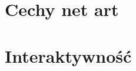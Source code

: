 \documentclass[a4paper,12pt,twoside]{article}
\begin{document}
\section{Cechy net art}
%
%
%
%
%

\section{Interaktywność}
\end{document}
